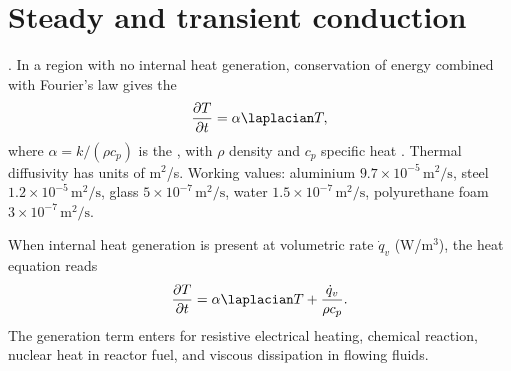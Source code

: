 \section{Steady and transient conduction}

. In a region with no internal heat
generation, conservation of energy combined with Fourier's law gives
the 
\[
\frac{\partial T}{\partial t} = \alpha \laplacian T,
\]
where $\alpha = k/(\rho c_p)$ is the ,
with $\rho$ density and $c_p$ specific heat \cite{text:incropera2007}.
Thermal diffusivity has units of m$^2$/s. Working values: aluminium
$9.7 \times 10^{-5}\,\text{m}^2/\text{s}$, steel $1.2 \times 10^{-5}\,
\text{m}^2/\text{s}$, glass $5 \times 10^{-7}\,\text{m}^2/\text{s}$,
water $1.5 \times 10^{-7}\,\text{m}^2/\text{s}$, polyurethane foam
$3 \times 10^{-7}\,\text{m}^2/\text{s}$.

When internal heat generation is present at volumetric rate $\dot{q}_v$
(W/m$^3$), the heat equation reads
\[
\frac{\partial T}{\partial t} = \alpha \laplacian T + \frac{\dot{q}_v}{
\rho c_p}.
\]
The generation term enters for resistive electrical heating, chemical
reaction, nuclear heat in reactor fuel, and viscous dissipation in
flowing fluids.


